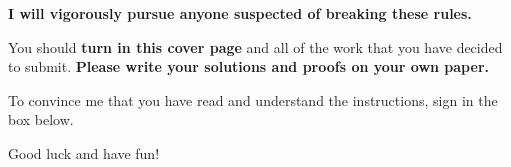 \documentclass[11pt]{article}
\theoremstyle{definition}
\begin{document}
\begin{center}
\textbf{I will vigorously pursue anyone suspected of breaking these rules.}
\end{center}

\bigskip

You should \textbf{turn in this cover page} and all of the work that you have decided to submit. \textbf{Please write your solutions and proofs on your own paper.}

\bigskip

To convince me that you have read and understand the instructions, sign in the box below.

\bigskip


\bigskip

Good luck and have fun!

\newpage
\end{document}
